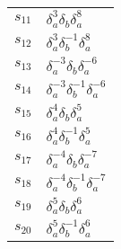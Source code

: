 \documentclass{article}
\begin{document}
\begin{center}
\begin{tabular}{ll}
$s_{11}$ & $\delta_a^{3}\delta_b^{}\delta_a^{8}$ \\
$s_{12}$ & $\delta_a^{3}\delta_b^{-1}\delta_a^{8}$ \\
$s_{13}$ & $\delta_a^{-3}\delta_b^{}\delta_a^{-6}$ \\
$s_{14}$ & $\delta_a^{-3}\delta_b^{-1}\delta_a^{-6}$ \\
$s_{15}$ & $\delta_a^{4}\delta_b^{}\delta_a^{5}$ \\
$s_{16}$ & $\delta_a^{4}\delta_b^{-1}\delta_a^{5}$ \\
$s_{17}$ & $\delta_a^{-4}\delta_b^{}\delta_a^{-7}$ \\
$s_{18}$ & $\delta_a^{-4}\delta_b^{-1}\delta_a^{-7}$ \\
$s_{19}$ & $\delta_a^{5}\delta_b^{}\delta_a^{6}$ \\
$s_{20}$ & $\delta_a^{5}\delta_b^{-1}\delta_a^{6}$ \\
\bottomrule
\end{tabular}
\end{center}

\thispagestyle{empty}
\end{document}
